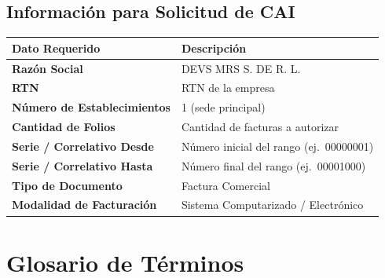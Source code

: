 \documentclass[12pt, letterpaper]{article}
\begin{document}
\subsection{Información para Solicitud de CAI}

\begin{tabularx}{\linewidth}{>{\bfseries}l X}
  \toprule
  Dato Requerido           & Descripción                                  \\
  \midrule
  Razón Social             & DEVS MRS S. DE R. L.                         \\
  RTN                      & RTN de la empresa                            \\
  Número de Establecimientos & 1 (sede principal)                          \\
  Cantidad de Folios       & Cantidad de facturas a autorizar             \\
  Serie / Correlativo Desde& Número inicial del rango (ej.\ 00000001)     \\
  Serie / Correlativo Hasta& Número final del rango (ej.\ 00001000)       \\
  Tipo de Documento        & Factura Comercial                            \\
  Modalidad de Facturación & Sistema Computarizado / Electrónico          \\
  \bottomrule
\end{tabularx}

\section{Glosario de Términos}
\end{document}
